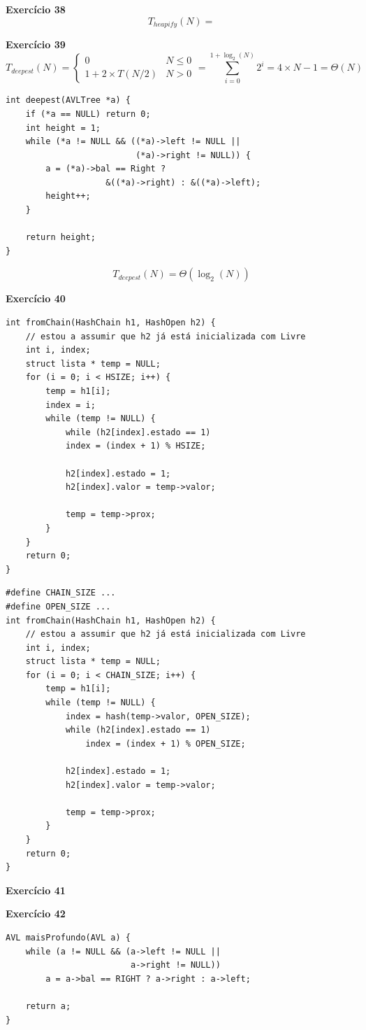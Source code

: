 \documentclass[a4paper,11pt]{article}
\begin{document}
\noindent \textbf{Exercício 38}~
\[
	T_{heapify}(N) = 
\]

\noindent \textbf{Exercício 39}
\[
T_{deepest}(N) = 
\begin{cases}
	0 & N \leq 0 \\
	1 + 2 \times T(N/2) & N > 0
\end{cases}
= \sum_{i=0}^{1+\log_2(N)} 2^i = 4 \times N - 1 = \Theta(N)
\]

\begin{verbatim}
int deepest(AVLTree *a) {
	if (*a == NULL) return 0; 
	int height = 1;
	while (*a != NULL && ((*a)->left != NULL || 
						  (*a)->right != NULL)) {
		a = (*a)->bal == Right ?
					&((*a)->right) : &((*a)->left);
		height++;
	}
		
	return height;
}
\end{verbatim}
\[
T_{deepest}(N) = \Theta(\log_2(N))
\]

\noindent \textbf{Exercício 40}

\begin{verbatim}
int fromChain(HashChain h1, HashOpen h2) {
	// estou a assumir que h2 já está inicializada com Livre
	int i, index;
	struct lista * temp = NULL;
	for (i = 0; i < HSIZE; i++) {
		temp = h1[i];
		index = i;
		while (temp != NULL) {
			while (h2[index].estado == 1)
			index = (index + 1) % HSIZE;
			
			h2[index].estado = 1;
			h2[index].valor = temp->valor;
			
			temp = temp->prox;
		}
	}
	return 0;
}
\end{verbatim}

\begin{verbatim}
#define CHAIN_SIZE ...
#define OPEN_SIZE ...
int fromChain(HashChain h1, HashOpen h2) {
	// estou a assumir que h2 já está inicializada com Livre
	int i, index;
	struct lista * temp = NULL;
	for (i = 0; i < CHAIN_SIZE; i++) {
		temp = h1[i];
		while (temp != NULL) {
			index = hash(temp->valor, OPEN_SIZE);
			while (h2[index].estado == 1)
				index = (index + 1) % OPEN_SIZE;
			
			h2[index].estado = 1;
			h2[index].valor = temp->valor;
			
			temp = temp->prox;
		}
	}
	return 0;
}
\end{verbatim}

\noindent \textbf{Exercício 41}


\noindent \textbf{Exercício 42}

\begin{verbatim}
AVL maisProfundo(AVL a) {
	while (a != NULL && (a->left != NULL || 
						 a->right != NULL))
		a = a->bal == RIGHT ? a->right : a->left;
	
	return a;
}
\end{verbatim}
\end{document}
